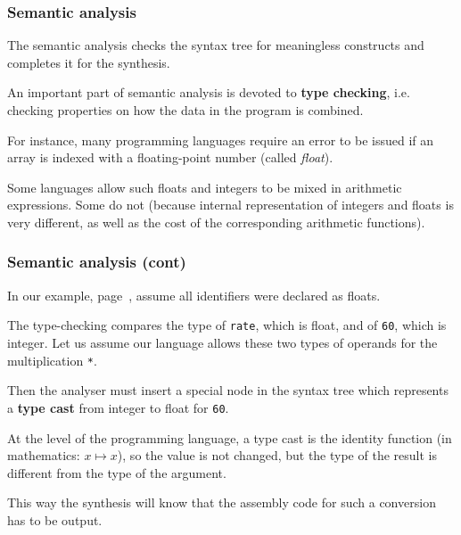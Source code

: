 %
\begin{frame}
\frametitle{Semantic analysis}

The semantic analysis checks the syntax tree for meaningless
constructs and completes it for the synthesis.

\bigskip

An important part of semantic analysis is devoted to
\textbf{type checking}, i.e. checking properties on how the data in
the program is combined.

\bigskip

For instance, many programming languages require an error to be
issued if an array is indexed with a floating-point number (called
\emph{float}).

\bigskip

Some languages allow such floats and integers to be mixed in
arithmetic expressions. Some do not (because internal representation
of integers and floats is very different, as well as the cost of the
corresponding arithmetic functions).

\end{frame}

%
\begin{frame}[containsverbatim]
\frametitle{Semantic analysis (cont)}

In our example, page~\pageref{ast_eg}, assume all identifiers were
declared as floats.

\bigskip

The type-checking compares the type of \texttt{rate}, which is float,
and of \texttt{60}, which is integer. Let us assume our language
allows these two types of operands for the multiplication \verb|*|.

\bigskip

Then the analyser must insert a special node in the syntax tree which
represents a \textbf{type cast} from integer to float for
\texttt{60}.

\bigskip

At the level of the programming language, a type cast is the identity
function (in mathematics: \(x \mapsto x\)), so the value is not
changed, but the type of the result is different from the type of the
argument.

\bigskip

This way the synthesis will know that the assembly code for such a
conversion has to be output.

\end{frame}

